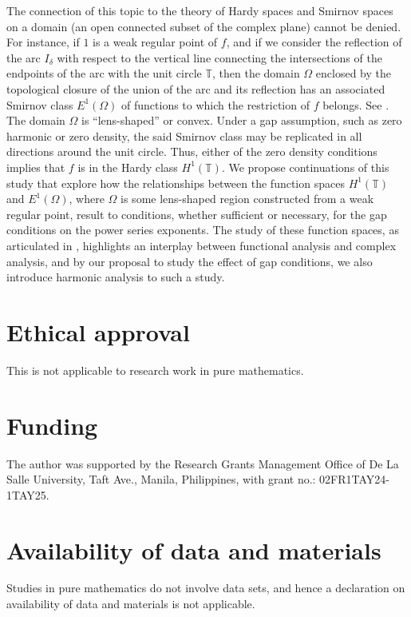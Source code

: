\documentclass[11pt,a4paper]{article}
\newcommand{\T}{\mathbb{T}}
\begin{document}
The connection of this topic to the theory of Hardy spaces and Smirnov spaces \cite{dur70, hof62} on a domain (an open connected subset of the complex plane) cannot be denied. For instance, if $1$ is a weak regular point of $f$, and if we consider the reflection of the arc $I_\delta$ with respect to the vertical line connecting the intersections of the endpoints of the arc with the unit circle $\T$, then the domain $\Omega$ enclosed by the topological closure of the union of the arc and its reflection has an associated Smirnov class $E^{1}(\Omega)$ of functions to which the restriction of $f$ belongs. See \cite[Section~10.1]{dur70}. The domain $\Omega$ is ``lens-shaped'' or convex. Under a gap assumption, such as zero harmonic or zero density, the said Smirnov class may be replicated in all directions around the unit circle. Thus, either of the zero density conditions implies that $f$ is in the Hardy class $H^1(\T)$. We propose continuations of this study that explore how the relationships between the function spaces $H^{1}(\T)$ and $E^{1}(\Omega)$, where $\Omega$ is some lens-shaped region constructed from a weak regular point, result to conditions, whether sufficient or necessary, for the gap conditions on the power series exponents. The study of these function spaces, as articulated in \cite[p.~vii]{hof62}, highlights an interplay between functional analysis and complex analysis, and by our proposal to study the effect of gap conditions, we also introduce harmonic analysis to such a study.

\section*{Ethical approval} This is not applicable to research work in pure mathematics.

\section*{Funding} The author was supported by the Research Grants Management Office of De La Salle University, Taft Ave., Manila, Philippines, with grant no.: 02FR1TAY24-1TAY25.

\section*{Availability of data and materials} Studies in pure mathematics do not involve data sets, and hence a declaration on availability of data and materials is not applicable.
\end{document}
